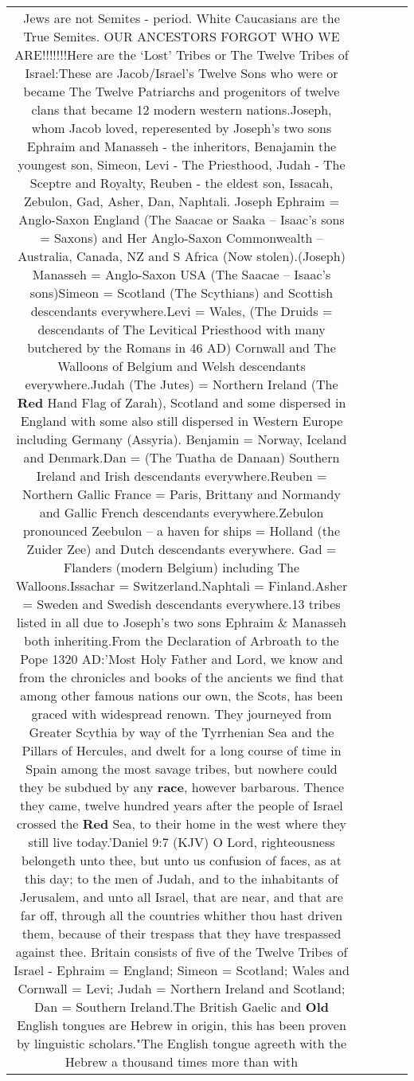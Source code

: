 \documentclass[11pt]{article}
\newlength\mylength
\begin{document}
\begin{center}
\begin{longtable}{|C{.65\mylength}|C{.30\mylength}|C{.12\mylength}|C{.12\mylength}|C{.12\mylength}|}
  \small Jews are not Semites - period. White Caucasians are the True Semites. OUR ANCESTORS FORGOT WHO WE ARE!!!!!!!Here are the ‘Lost' Tribes or The Twelve Tribes of Israel:These are Jacob/Israel's Twelve Sons who were or became The Twelve Patriarchs and progenitors of twelve clans that became 12 modern western nations.Joseph, whom Jacob loved, reperesented by Joseph's two sons Ephraim and Manasseh - the inheritors, Benajamin the youngest son, Simeon, Levi - The Priesthood, Judah - The Sceptre and Royalty, Reuben - the eldest son, Issacah, Zebulon, Gad, Asher, Dan, Naphtali.   Joseph Ephraim = Anglo-Saxon England (The Saacae or Saaka – Isaac's sons = Saxons) and Her Anglo-Saxon Commonwealth – Australia, Canada, NZ and S Africa (Now stolen).(Joseph) Manasseh = Anglo-Saxon USA (The Saacae – Isaac's sons)Simeon = Scotland (The Scythians) and Scottish descendants everywhere.Levi = Wales, (The Druids = descendants of The Levitical Priesthood with many butchered by the Romans in 46 AD) Cornwall and The Walloons of Belgium and Welsh descendants everywhere.Judah (The Jutes) = Northern Ireland (The \textbf{R\textbf{ed}} Hand Flag of Zarah), Scotland and some dispersed in England with some also still dispersed in Western Europe including Germany (Assyria). Benjamin = Norway, Iceland and Denmark.Dan = (The Tuatha de Danaan) Southern Ireland and Irish descendants everywhere.Reuben = Northern Gallic France = Paris, Brittany and Normandy and Gallic French descendants everywhere.Zebulon pronounced Zeebulon – a haven for ships = Holland (the Zuider Zee) and Dutch descendants everywhere. Gad = Flanders (modern Belgium) including The Walloons.Issachar = Switzerland.Naphtali = Finland.Asher = Sweden and Swedish descendants everywhere.13 tribes listed in all due to Joseph's two sons Ephraim \& Manasseh both inheriting.From the Declaration of Arbroath to the Pope 1320 AD:'Most Holy Father and Lord, we know and from the chronicles and books of the ancients we find that among other famous nations our own, the Scots, has been graced with widespread renown. They journeyed from Greater Scythia by way of the Tyrrhenian Sea and the Pillars of Hercules, and dwelt for a long course of time in Spain among the most savage tribes, but nowhere could they be subdued by any \textbf{race}, however barbarous. Thence they came, twelve hundred years after the people of Israel crossed the \textbf{R\textbf{ed}} Sea, to their home in the west where they still live today.'Daniel 9:7 (KJV) O Lord, righteousness belongeth unto thee, but unto us confusion of faces, as at this day; to the men of Judah, and to the inhabitants of Jerusalem, and unto all Israel, that are near, and that are far off, through all the countries whither thou hast driven them, because of their trespass that they have trespassed against thee. Britain consists of five of the Twelve Tribes of Israel - Ephraim = England; Simeon = Scotland; Wales and Cornwall = Levi; Judah = Northern Ireland and Scotland; Dan = Southern Ireland.The British Gaelic and \textbf{Old} English tongues are Hebrew in origin, this has been proven by linguistic scholars."The English tongue agreeth with the Hebrew a thousand times more than with 
\end{longtable}
\end{center}
\end{document}
